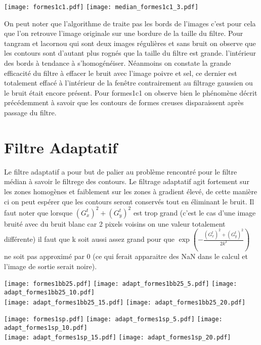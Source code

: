 \documentclass[12pt]{article}
\numberwithin{equation}{section}
\begin{document}
\begin{center}
\texttt{[image: formes1c1.pdf]}
\texttt{[image: median\_formes1c1\_3.pdf]}
\end{center}
On peut noter que l'algorithme de traite pas les bords de l'images c'est pour cela que l'on retrouve l'image originale sur une bordure de la taille du filtre. Pour tangram et lacornou qui sont deux images régulières et sans bruit on observe que les contours sont d'autant plus rognés que la taille du filtre est grande. l'intérieur des bords à tendance à s'homogénéiser. Néanmoins on constate la grande efficacité du filtre à effacer le bruit avec l'image poivre et sel, ce dernier est totalement effacé à l'intérieur de la fenêtre contrairement au filtrage gaussien ou le bruit était encore présent. Pour formes1c1 on observe bien le phénomène décrit précédemment à savoir que les contours de formes creuses disparaissent après passage du filtre. 
\section{Filtre Adaptatif}
Le filtre adaptatif a pour but de palier au problème rencontré pour le filtre médian à savoir le filtrege des contours. Le filtrage adaptatif agit fortement sur les zones homogènes et faiblement sur les zones à gradient élevé, de cette manière ci on peut espérer que les contours seront conservés tout en éliminant le bruit. Il faut noter que lorsque $(G_x^t)^2 + (G_y^t)^2$ est trop grand (c'est le cas d'une image bruité avec du bruit blanc car 2 pixels voisins on une valeur totalement différente) il faut que k soit aussi assez grand pour que $\exp(-\frac{(G_x^t)^2 + (G_y^t)^2}{2k^2})$ ne soit pas approximé par 0 (ce qui ferait apparaitre des NaN dans le calcul et l'image de sortie serait noire). 

\begin{center}
\texttt{[image: formes1bb25.pdf]}
\texttt{[image: adapt\_formes1bb25\_5.pdf]}
\texttt{[image: adapt\_formes1bb25\_10.pdf]}\\
\texttt{[image: adapt\_formes1bb25\_15.pdf]}
\texttt{[image: adapt\_formes1bb25\_20.pdf]}
\end{center}

\begin{center}
\texttt{[image: formes1sp.pdf]}
\texttt{[image: adapt\_formes1sp\_5.pdf]}
\texttt{[image: adapt\_formes1sp\_10.pdf]}\\
\texttt{[image: adapt\_formes1sp\_15.pdf]}
\texttt{[image: adapt\_formes1sp\_20.pdf]}
\end{center}
\end{document}
